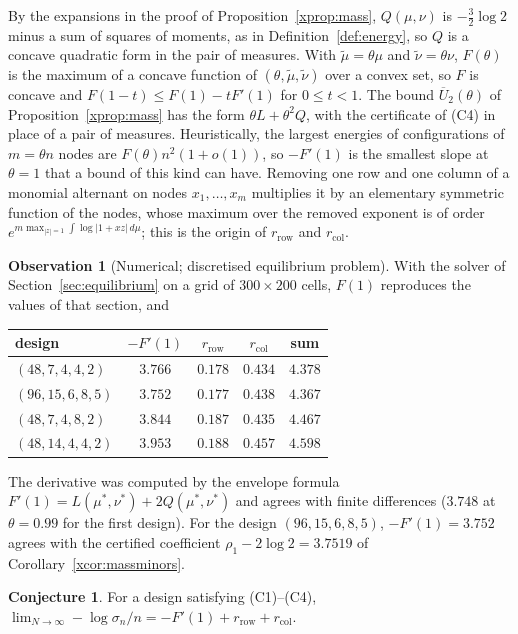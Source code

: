 \documentclass[11pt]{article}
\theoremstyle{definition}
\newtheorem{observation}[theorem]{Observation}
\newtheorem{conjecture}[theorem]{Conjecture}
\begin{document}
By the expansions in the proof of Proposition~\ref{xprop:mass}, $Q(\mu,\nu)$ is $-\frac32\log2$ minus a sum of squares of moments, as in Definition~\ref{def:energy}, so $Q$ is a concave quadratic form in the pair of measures. With $\tilde\mu=\theta\mu$ and $\tilde\nu=\theta\nu$, $F(\theta)$ is the maximum of a concave function of $(\theta,\tilde\mu,\tilde\nu)$ over a convex set, so $F$ is concave and $F(1-t)\le F(1)-tF'(1)$ for $0\le t<1$. The bound $\overline U_2(\theta)$ of Proposition~\ref{xprop:mass} has the form $\theta L+\theta^2Q$, with the certificate of (C4) in place of a pair of measures. Heuristically, the largest energies of configurations of $m=\theta n$ nodes are $F(\theta)n^2(1+o(1))$, so $-F'(1)$ is the smallest slope at $\theta=1$ that a bound of this kind can have. Removing one row and one column of a monomial alternant on nodes $x_1,\dots,x_m$ multiplies it by an elementary symmetric function of the nodes, whose maximum over the removed exponent is of order $e^{m\max_{|z|=1}\int\log|1+xz|\,d\mu}$; this is the origin of $r_{\mathrm{row}}$ and $r_{\mathrm{col}}$.

\begin{observation}[Numerical; discretised equilibrium problem]\label{xobs:slope}
With the solver of Section~\ref{sec:equilibrium} on a grid of $300\times200$ cells, $F(1)$ reproduces the values of that section, and
\begin{center}
\begin{tabular}{lcccc}
\toprule
design & $-F'(1)$ & $r_{\mathrm{row}}$ & $r_{\mathrm{col}}$ & sum\\
\midrule
$(48,7,4,4,2)$ & $3.766$ & $0.178$ & $0.434$ & $4.378$\\
$(96,15,6,8,5)$ & $3.752$ & $0.177$ & $0.438$ & $4.367$\\
$(48,7,4,8,2)$ & $3.844$ & $0.187$ & $0.435$ & $4.467$\\
$(48,14,4,4,2)$ & $3.953$ & $0.188$ & $0.457$ & $4.598$\\
\bottomrule
\end{tabular}
\end{center}
The derivative was computed by the envelope formula $F'(1)=L(\mu^*,\nu^*)+2Q(\mu^*,\nu^*)$ and agrees with finite differences ($3.748$ at $\theta=0.99$ for the first design). For the design $(96,15,6,8,5)$, $-F'(1)=3.752$ agrees with the certified coefficient $\rho_1-2\log2=3.7519$ of Corollary~\ref{xcor:massminors}.
\end{observation}

\begin{conjecture}\label{xconj:smin}
For a design satisfying (C1)--(C4), $\lim_{N\to\infty}-\log\sigma_n/n=-F'(1)+r_{\mathrm{row}}+r_{\mathrm{col}}$.
\end{conjecture}
\end{document}
